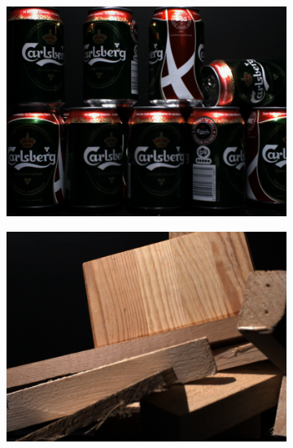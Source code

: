 \documentclass[thesis.tex]{subfiles}
\begin{document}
\begin{figure}
	\centering
	\begin{subfigure}{0.4\textwidth}
		\includegraphics[width=\textwidth]{img/dtu_example_1.png}
	\end{subfigure}
	\begin{subfigure}{0.4\textwidth}
		\includegraphics[width=\textwidth]{img/dtu_example_2.png}
	\end{subfigure}
	\begin{subfigure}{0.4\textwidth}

\end{subfigure}
\end{figure}
\end{document}
